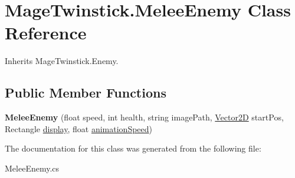 \hypertarget{class_mage_twinstick_1_1_melee_enemy}{}\section{Mage\+Twinstick.\+Melee\+Enemy Class Reference}
\label{class_mage_twinstick_1_1_melee_enemy}


Inherits Mage\+Twinstick.\+Enemy.

\subsection*{Public Member Functions}
\begin{DoxyCompactItemize}
\item 
\hypertarget{class_mage_twinstick_1_1_melee_enemy_a57032b177c12225e99ce837002bead9b}{}{\bfseries Melee\+Enemy} (float speed, int health, string image\+Path, \hyperlink{class_mage_twinstick_1_1_vector2_d}{Vector2\+D} start\+Pos, Rectangle \hyperlink{class_mage_twinstick_1_1_game_object_a5807df7f837dc87c8955a008d0b27b50}{display}, float \hyperlink{class_mage_twinstick_1_1_game_object_a5d21c31402c27c5a19f2a62d98720456}{animation\+Speed})\label{class_mage_twinstick_1_1_melee_enemy_a57032b177c12225e99ce837002bead9b}

\end{DoxyCompactItemize}


The documentation for this class was generated from the following file\+:\begin{DoxyCompactItemize}
\item 
Melee\+Enemy.\+cs\end{DoxyCompactItemize}
